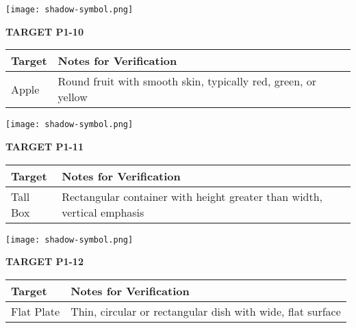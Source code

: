\documentclass[10pt,twoside,final]{book} %
\makeatletter
\newcommand{\cleardoublepageWithSymbol}{%
  \clearpage %
  \if@twoside %
    \ifodd\c@page %
    \else %
      \thispagestyle{fancy} %
      \begingroup %
        \vspace*{0pt} %
        \vfill %
        \centering %
        \noindent 
        \texttt{[image: shadow-symbol.png]}
        \vfill %
      \endgroup
      \newpage    %
      \if@twocolumn\if@firstcolumn\else\hbox{}\newpage\fi\fi
    \fi
  \fi
}
\makeatother
\begin{document}
\cleardoublepageWithSymbol
\label{target:P1-10}
\begin{center}
\Large\textbf{TARGET P1-10}
\end{center}
\begin{mdframed}[backgroundcolor=white, linewidth=0.7pt, linecolor=rvprimary, shadow=true, shadowsize=1pt, shadowcolor=graydark!40, roundcorner=3pt]
\begin{tabular}{|p{3.5cm}|p{9cm}|}
\hline
\rowcolor{rvprimary!15}
\textbf{Target} & \textbf{Notes for Verification} \\
\hline
Apple & Round fruit with smooth skin, typically red, green, or yellow \\
\hline
\end{tabular}
\end{mdframed}


\cleardoublepageWithSymbol
\label{target:P1-11}
\begin{center}
\Large\textbf{TARGET P1-11}
\end{center}
\begin{mdframed}[backgroundcolor=white, linewidth=0.7pt, linecolor=rvprimary, shadow=true, shadowsize=1pt, shadowcolor=graydark!40, roundcorner=3pt]
\begin{tabular}{|p{3.5cm}|p{9cm}|}
\hline
\rowcolor{rvprimary!15}
\textbf{Target} & \textbf{Notes for Verification} \\
\hline
Tall Box & Rectangular container with height greater than width, vertical emphasis \\
\hline
\end{tabular}
\end{mdframed}


\cleardoublepageWithSymbol
\label{target:P1-12}
\begin{center}
\Large\textbf{TARGET P1-12}
\end{center}
\begin{mdframed}[backgroundcolor=white, linewidth=0.7pt, linecolor=rvprimary, shadow=true, shadowsize=1pt, shadowcolor=graydark!40, roundcorner=3pt]
\begin{tabular}{|p{3.5cm}|p{9cm}|}
\hline
\rowcolor{rvprimary!15}
\textbf{Target} & \textbf{Notes for Verification} \\
\hline
Flat Plate & Thin, circular or rectangular dish with wide, flat surface \\
\hline
\end{tabular}
\end{mdframed}
\end{document}
